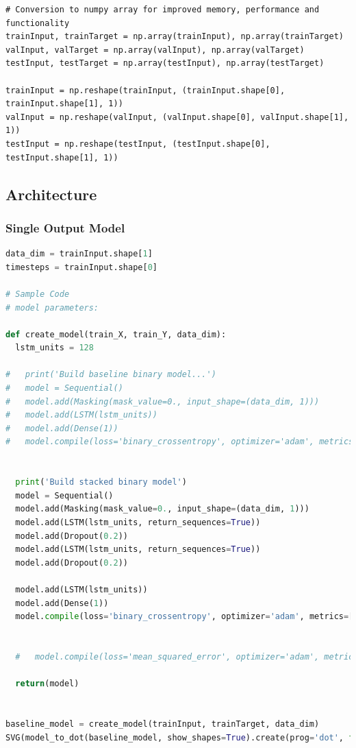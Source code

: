 \documentclass[10pt,onecolumn,letterpaper]{article}
\begin{document}
\begin{lstlisting} 
# Conversion to numpy array for improved memory, performance and functionality
trainInput, trainTarget = np.array(trainInput), np.array(trainTarget)
valInput, valTarget = np.array(valInput), np.array(valTarget)
testInput, testTarget = np.array(testInput), np.array(testTarget)

trainInput = np.reshape(trainInput, (trainInput.shape[0], trainInput.shape[1], 1))
valInput = np.reshape(valInput, (valInput.shape[0], valInput.shape[1], 1))
testInput = np.reshape(testInput, (testInput.shape[0], testInput.shape[1], 1))
\end{lstlisting} 





\subsection{Architecture} 
\subsubsection{Single Output Model}

\begin{lstlisting}[language=Python, breaklines=true]
data_dim = trainInput.shape[1]
timesteps = trainInput.shape[0]

# Sample Code
# model parameters:

def create_model(train_X, train_Y, data_dim):
  lstm_units = 128
  
#   print('Build baseline binary model...')
#   model = Sequential()
#   model.add(Masking(mask_value=0., input_shape=(data_dim, 1)))
#   model.add(LSTM(lstm_units))
#   model.add(Dense(1))
#   model.compile(loss='binary_crossentropy', optimizer='adam', metrics=['accuracy'])
  
  
  print('Build stacked binary model')
  model = Sequential()
  model.add(Masking(mask_value=0., input_shape=(data_dim, 1)))
  model.add(LSTM(lstm_units, return_sequences=True))
  model.add(Dropout(0.2))
  model.add(LSTM(lstm_units, return_sequences=True))
  model.add(Dropout(0.2))

  model.add(LSTM(lstm_units))
  model.add(Dense(1))
  model.compile(loss='binary_crossentropy', optimizer='adam', metrics=['accuracy'])

  
  #   model.compile(loss='mean_squared_error', optimizer='adam', metrics=['accuracy'])

  return(model)

  
baseline_model = create_model(trainInput, trainTarget, data_dim)
SVG(model_to_dot(baseline_model, show_shapes=True).create(prog='dot', format='svg'))
\end{lstlisting} 
\end{document}
